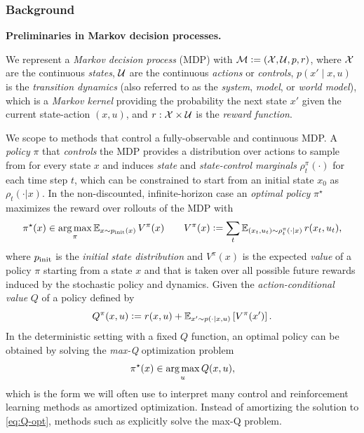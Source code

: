 \documentclass[twoside,11pt]{article}
\begin{document}
\subsubsection{Background}
\textbf{Preliminaries in Markov decision processes.}
\begin{definition}
  We represent a \emph{Markov decision process} (MDP) with
  ${\mathcal{M}}\vcentcolon=({\mathcal{X}}, {\mathcal{U}}, p, r)$,
  where ${\mathcal{X}}$ are the continuous \emph{states},
  ${\mathcal{U}}$ are the continuous \emph{actions} or \emph{controls},
  $p(x' \mid x, u)$ is the \emph{transition dynamics}
  (also referred to as the \emph{system}, \emph{model},
  or \emph{world model}),
  which is a \emph{Markov kernel} providing
  the probability the next state $x'$
  given the current state-action $(x, u)$,
  and $r: {\mathcal{X}}\times{\mathcal{U}}$ is the \emph{reward function}.
\end{definition}
We scope to methods that control a
fully-observable and continuous MDP.
A \emph{policy} $\pi$ that \emph{controls}
the MDP provides a distribution over actions to sample from
for every state $x$ and induces \emph{state} and
\emph{state-control marginals} $\rho_t^\pi(\cdot)$ for each
time step $t$, which can be constrained to start from an initial
state $x_0$ as $\rho_t(\cdot|x)$.
In the non-discounted, infinite-horizon case
an \emph{optimal policy} $\pi^\star$ maximizes the reward over
rollouts of the MDP with
\begin{equation}
  \pi^\star(x)\in \operatorname*{arg\,max}_\pi \operatorname{\mathbb{E}}_{x\sim p_{\rm init}(x)} V^\pi(x)
  \qquad
  V^\pi(x)\vcentcolon= \sum_t \operatorname{\mathbb{E}}_{(x_t, u_t)\sim\rho_t^\pi(\cdot\mid x)} r(x_t, u_t),
  \label{eq:pistar}
\end{equation}
where $p_{\rm init}$ is the \emph{initial state distribution}
and $V^\pi(x)$ is the expected \emph{value} of a policy $\pi$
starting from a state $x$ and that is taken over all possible
future rewards induced by the stochastic policy and dynamics.
Given the \emph{action-conditional value} $Q$ of a policy
defined by
\begin{equation}
  Q^\pi(x, u)\vcentcolon= r(x, u) + \operatorname{\mathbb{E}}_{x'\sim p(\cdot|x,u)}\left[V^\pi(x')\right].
  \label{eq:Q}
\end{equation}
In the deterministic setting with a fixed $Q$ function,
an optimal policy can be obtained by solving the
\emph{max-Q} optimization problem
\begin{equation}
  \pi^\star(x) \in \operatorname*{arg\,max}_u Q(x, u),
  \label{eq:Q-opt}
\end{equation}
which is the form we will often use to interpret many
control and reinforcement learning methods
as amortized optimization.
Instead of amortizing the solution to \cref{eq:Q-opt},
methods such as \citet{lowrey2018plan,ryu2019caql}
explicitly solve the max-Q problem.
\end{document}
